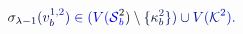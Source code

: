 \documentclass[12pt]{article}
\begin{document}
\makeatletter
\renewcommand*{\@textcolor}[3]{%
  \protect\leavevmode
  \begingroup
    \color#1{#2}#3%
  \endgroup
}
\makeatother
\begin{displaymath}
\mathcolor[RGB]{0,0,15}{\sigma} _ { \mathcolor[RGB]{0,0,30}{\lambda} \mathcolor[RGB]{0,0,45}{-} \mathcolor[RGB]{0,0,60}{1} } \mathcolor[RGB]{0,0,75}{(} \mathcolor[RGB]{0,0,90}{v} _ { \mathcolor[RGB]{0,0,105}{b} } ^ { \mathcolor[RGB]{0,0,120}{1} \mathcolor[RGB]{0,0,135}{,} \mathcolor[RGB]{0,0,150}{2} } \mathcolor[RGB]{0,0,165}{)} \mathcolor[RGB]{0,0,180}{\in} \mathcolor[RGB]{0,0,195}{(} \mathcolor[RGB]{0,0,210}{V} \mathcolor[RGB]{0,0,225}{(} \mathcal { \mathcolor[RGB]{0,0,240}{S} } _ { \mathcolor[RGB]{0,0,255}{b} } ^ { \mathcolor[RGB]{0,15,0}{2} } \mathcolor[RGB]{0,15,15}{)} \mathcolor[RGB]{0,15,30}{\setminus} \mathcolor[RGB]{0,15,45}{\{} \mathcolor[RGB]{0,15,60}{\kappa} _ { \mathcolor[RGB]{0,15,75}{b} } ^ { \mathcolor[RGB]{0,15,90}{2} } \mathcolor[RGB]{0,15,105}{\}} \mathcolor[RGB]{0,15,120}{)} \mathcolor[RGB]{0,15,135}{\cup} \mathcolor[RGB]{0,15,150}{V} \mathcolor[RGB]{0,15,165}{(} \mathcal { \mathcolor[RGB]{0,15,180}{K} } ^ { \mathcolor[RGB]{0,15,195}{2} } \mathcolor[RGB]{0,15,210}{)} \mathcolor[RGB]{0,15,225}{.}
\end{displaymath}
\end{document}
